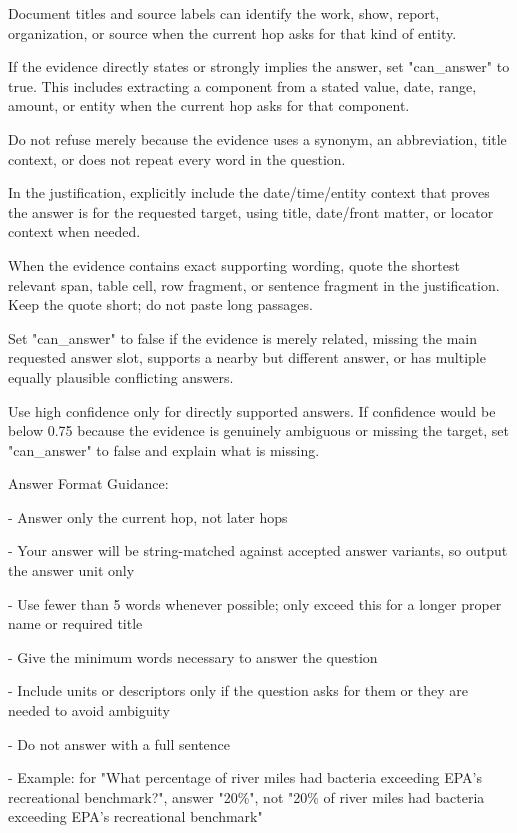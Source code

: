 \begin{tcolorbox}
\begin{scriptsize}
Document titles and source labels can identify the work, show, report, organization, or source when the current hop asks for that kind of entity.\par
If the evidence directly states or strongly implies the answer, set "can\_answer" to true. This includes extracting a component from a stated value, date, range, amount, or entity when the current hop asks for that component.\par
Do not refuse merely because the evidence uses a synonym, an abbreviation, title context, or does not repeat every word in the question.\par
In the justification, explicitly include the date/time/entity context that proves the answer is for the requested target, using title, date/front matter, or locator context when needed.\par
When the evidence contains exact supporting wording, quote the shortest relevant span, table cell, row fragment, or sentence fragment in the justification. Keep the quote short; do not paste long passages.\par
Set "can\_answer" to false if the evidence is merely related, missing the main requested answer slot, supports a nearby but different answer, or has multiple equally plausible conflicting answers.\par
Use high confidence only for directly supported answers. If confidence would be below 0.75 because the evidence is genuinely ambiguous or missing the target, set "can\_answer" to false and explain what is missing.\par
\mbox{}\par
Answer Format Guidance:\par
- Answer only the current hop, not later hops\par
- Your answer will be string-matched against accepted answer variants, so output the answer unit only\par
- Use fewer than 5 words whenever possible; only exceed this for a longer proper name or required title\par
- Give the minimum words necessary to answer the question\par
- Include units or descriptors only if the question asks for them or they are needed to avoid ambiguity\par
- Do not answer with a full sentence\par
- Example: for "What percentage of river miles had bacteria exceeding EPA's recreational benchmark?", answer "20\%", not "20\% of river miles had bacteria exceeding EPA's recreational benchmark"\par

\end{scriptsize}
\end{tcolorbox}
